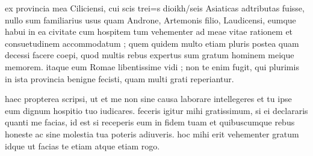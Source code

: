 


 ex provincia mea Ciliciensi, cui scis trei=s dioikh/seis Asiaticas adtributas fuisse, nullo sum familiarius usus quam Androne, Artemonis filio, Laudicensi, eumque habui in ea civitate cum hospitem tum vehementer ad meae vitae rationem et consuetudinem accommodatum ; quem quidem multo etiam pluris postea quam decessi facere coepi, quod multis rebus expertus sum gratum hominem meique memorem. itaque eum Romae libentissime vidi ; non te enim fugit, qui plurimis in ista provincia benigne fecisti, quam multi grati reperiantur.

 haec propterea scripsi, ut et me non sine causa laborare intellegeres et tu ipse eum dignum hospitio tuo iudicares. feceris igitur mihi gratissimum, si ei declararis quanti me facias, id est si receperis eum in fidem tuam et quibuscumque rebus honeste ac sine molestia tua poteris adiuveris. hoc mihi erit vehementer gratum idque ut facias te etiam atque etiam rogo.
